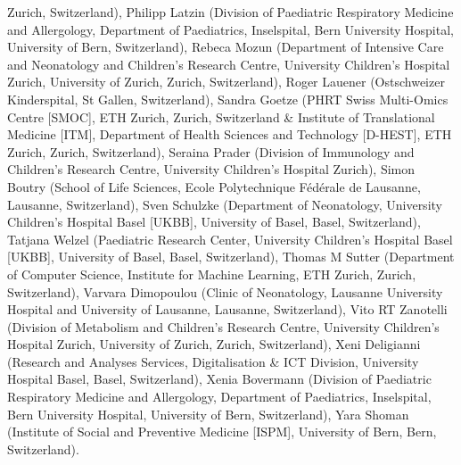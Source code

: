 Zurich, Switzerland), Philipp Latzin (Division of Paediatric Respiratory Medicine and Allergology, Department of Paediatrics, Inselspital, Bern University Hospital, University of Bern, Switzerland), Rebeca Mozun (Department of Intensive Care and Neonatology and Children’s Research Centre, University Children’s Hospital Zurich, University of Zurich, Zurich, Switzerland), Roger Lauener (Ostschweizer Kinderspital, St Gallen, Switzerland), Sandra Goetze (PHRT Swiss Multi-Omics Centre [SMOC], ETH Zurich, Zurich, Switzerland \& Institute of Translational Medicine [ITM], Department of Health Sciences and Technology [D-HEST], ETH Zurich, Zurich, Switzerland), Seraina Prader (Division of Immunology and Children’s Research Centre, University Children’s Hospital Zurich), Simon Boutry (School of Life Sciences, Ecole Polytechnique Fédérale de Lausanne, Lausanne, Switzerland), Sven Schulzke (Department of Neonatology, University Children's Hospital Basel [UKBB], University of Basel, Basel, Switzerland), Tatjana Welzel (Paediatric Research Center, University Children's Hospital Basel [UKBB], University of Basel, Basel, Switzerland), Thomas M Sutter (Department of Computer Science, Institute for Machine Learning, ETH Zurich, Zurich, Switzerland), Varvara Dimopoulou (Clinic of Neonatology, Lausanne University Hospital and University of Lausanne, Lausanne, Switzerland), Vito RT Zanotelli (Division of Metabolism and Children’s Research Centre, University Children’s Hospital Zurich, University of Zurich, Zurich, Switzerland), Xeni Deligianni (Research and Analyses Services, Digitalisation \& ICT Division, University Hospital Basel, Basel, Switzerland), Xenia Bovermann (Division of Paediatric Respiratory Medicine and Allergology, Department of Paediatrics, Inselspital, Bern University Hospital, University of Bern, Switzerland), Yara Shoman (Institute of Social and Preventive Medicine [ISPM], University of Bern, Bern, Switzerland).

\clearpage

 


